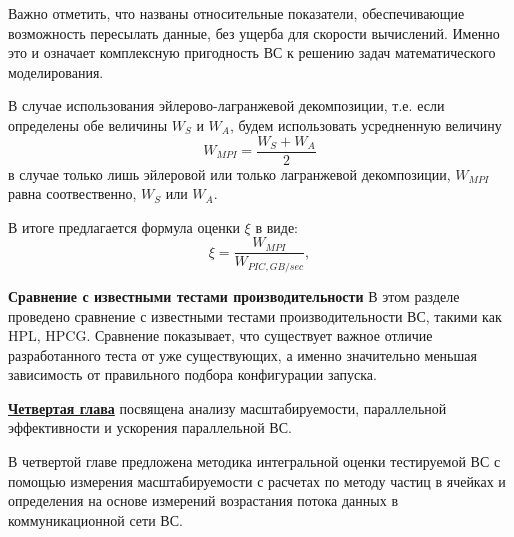 Важно отметить, что названы относительные показатели, обеспечивающие возможность пересылать данные, без ущерба для скорости вычислений. Именно это и означает  комплексную пригодность ВС к решению задач математического моделирования.

В случае использования эйлерово-лагранжевой декомпозиции, т.е. если определены обе величины $W_S$ и $W_A$, будем использовать усредненную величину
\begin{equation}
W_{MPI} = \frac{W_S + W_A}{2}
\end{equation}
в случае только лишь эйлеровой или только лагранжевой декомпозиции, $W_{MPI}$ равна соотвественно, $W_S$ или $W_A$.

В итоге предлагается формула оценки $\xi$ в виде:
\begin{equation}
\xi = \frac{W_{MPI}} { W_{PIC,GB/sec}}, 
\label{complex_rating}
\end{equation}

\textbf{Сравнение с известными тестами производительности}
В этом разделе проведено сравнение с известными тестами производительности ВС, такими как HPL, HPCG. Сравнение показывает, что существует важное отличие разработанного теста от уже существующих, а именно значительно меньшая зависимость от правильного подбора конфигурации запуска. 


\underline{\textbf{Четвертая глава}} посвящена  
анализу масштабируемости, параллельной эффективности и ускорения параллельной ВС.

В четвертой главе предложена методика интегральной оценки тестируемой ВС с помощью измерения масштабируемости с расчетах по методу частиц в ячейках и определения на основе измерений возрастания потока данных в коммуникационной сети ВС.





